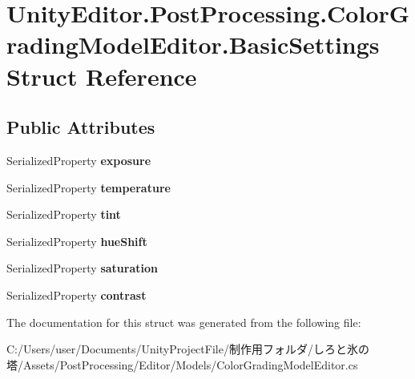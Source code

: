 \hypertarget{struct_unity_editor_1_1_post_processing_1_1_color_grading_model_editor_1_1_basic_settings}{}\section{Unity\+Editor.\+Post\+Processing.\+Color\+Grading\+Model\+Editor.\+Basic\+Settings Struct Reference}
\label{struct_unity_editor_1_1_post_processing_1_1_color_grading_model_editor_1_1_basic_settings}
\subsection*{Public Attributes}
\begin{DoxyCompactItemize}
\item 
\mbox{\label{struct_unity_editor_1_1_post_processing_1_1_color_grading_model_editor_1_1_basic_settings_a5441cc7cc1e8ed4831d9c436374d6bad}} 
Serialized\+Property {\bfseries exposure}
\item 
\mbox{\label{struct_unity_editor_1_1_post_processing_1_1_color_grading_model_editor_1_1_basic_settings_ab08b17bf013be887a2606f3ef93a6a6f}} 
Serialized\+Property {\bfseries temperature}
\item 
\mbox{\label{struct_unity_editor_1_1_post_processing_1_1_color_grading_model_editor_1_1_basic_settings_a62749a6221b08c8e5350a2b148fbf3ed}} 
Serialized\+Property {\bfseries tint}
\item 
\mbox{\label{struct_unity_editor_1_1_post_processing_1_1_color_grading_model_editor_1_1_basic_settings_a893070d6901e25096c2d782bc3d2102b}} 
Serialized\+Property {\bfseries hue\+Shift}
\item 
\mbox{\label{struct_unity_editor_1_1_post_processing_1_1_color_grading_model_editor_1_1_basic_settings_ad80614f32ce7a9991cd6fc0001b1e87d}} 
Serialized\+Property {\bfseries saturation}
\item 
\mbox{\label{struct_unity_editor_1_1_post_processing_1_1_color_grading_model_editor_1_1_basic_settings_a62e552d3fcc7e48384f8fca43bd8a828}} 
Serialized\+Property {\bfseries contrast}
\end{DoxyCompactItemize}


The documentation for this struct was generated from the following file\+:\begin{DoxyCompactItemize}
\item 
C\+:/\+Users/user/\+Documents/\+Unity\+Project\+File/制作用フォルダ/しろと氷の塔/\+Assets/\+Post\+Processing/\+Editor/\+Models/Color\+Grading\+Model\+Editor.\+cs\end{DoxyCompactItemize}
